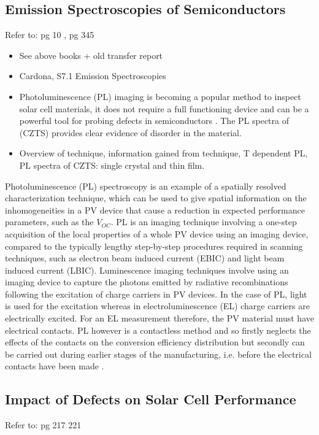 \subsection{Emission Spectroscopies of Semiconductors}\label{PL_section}
Refer to: pg 10 \cite{spatial_resolved_book}, pg 345 \cite{fund_semi}\\

\begin{itemize}
\item See above books + old transfer report
\item Cardona, S7.1 Emission Spectroscopies
\item Photoluminescence (PL) imaging is becoming a popular method to inspect solar cell materials, it does not require a full functioning device and can be a powerful tool for probing defects in semiconductors \cite{characterization_book, Gerschon}. The PL spectra of \CZTS (CZTS) provides clear evidence of disorder in the material.
\item Overview of technique, information gained from technique, T dependent PL, PL spectra of CZTS: single crystal and thin film.
\end{itemize}

Photoluminescence (PL) spectroscopy is an example of a spatially resolved characterization technique, which can be used to give spatial information on the inhomogeneities in a PV device that cause a reduction in expected performance parameters, such as the $V_{OC}$.
PL is an imaging technique involving a one-step acquisition of the local properties of a whole PV device using an imaging device, compared to the typically lengthy step-by-step procedures required in scanning techniques, such as electron beam induced current (EBIC) and light beam induced current (LBIC). Luminescence imaging techniques involve using an imaging device to capture the photons emitted by radiative recombinations following the excitation of charge carriers in PV devices. In the case of PL, light is used for the excitation whereas in electroluminescence (EL) charge carriers are electrically excited. For an EL measurement therefore, the PV material must have electrical contacts. PL however is a contactless method and so firstly neglects the effects of the contacts on the conversion efficiency distribution but secondly can be carried out during earlier stages of the manufacturing, i.e. before the electrical contacts have been made \cite{spatial_resolved_book}.




\subsection{Impact of Defects on Solar Cell Performance}\label{defects_in_PV}
Refer to: pg 217 221 \cite{thin_film_Boer}\\

